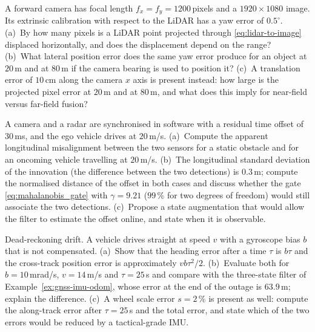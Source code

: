 \begin{prob}\label{prob:ch05:1}
A forward camera has focal length $f_{x}=f_{y}=1200$\,pixels and a $1920\times1080$ image. Its extrinsic calibration with respect to the LiDAR has a yaw error of $0.5^{\circ}$. (a)~By how many pixels is a LiDAR point projected through \eqref{eq:lidar-to-image} displaced horizontally, and does the displacement depend on the range? (b)~What lateral position error does the same yaw error produce for an object at $20$\,m and at $80$\,m if the camera bearing is used to position it? (c)~A translation error of $10$\,cm along the camera $x$ axis is present instead: how large is the projected pixel error at $20$\,m and at $80$\,m, and what does this imply for near-field versus far-field fusion?
\end{prob}

\begin{prob}\label{prob:ch05:2}
A camera and a radar are synchronised in software with a residual time offset of $30$\,ms, and the ego vehicle drives at $20$\,m/s. (a)~Compute the apparent longitudinal misalignment between the two sensors for a static obstacle and for an oncoming vehicle travelling at $20$\,m/s. (b)~The longitudinal standard deviation of the innovation (the difference between the two detections) is $0.3$\,m; compute the normalised distance of the offset in both cases and discuss whether the gate \eqref{eq:mahalanobis_gate} with $\gamma=9.21$ ($99$\,\% for two degrees of freedom) would still associate the two detections. (c)~Propose a state augmentation that would allow the filter to estimate the offset online, and state when it is observable.
\end{prob}

\begin{prob}\label{prob:ch05:3}
Dead-reckoning drift. A vehicle drives straight at speed $v$ with a gyroscope bias $b$ that is not compensated. (a)~Show that the heading error after a time $\tau$ is $b\tau$ and the cross-track position error is approximately $vb\tau^{2}/2$. (b)~Evaluate both for $b=10$\,mrad/s, $v=14$\,m/s and $\tau=25$\,s and compare with the three-state filter of Example~\ref{ex:gnss-imu-odom}, whose error at the end of the outage is $63.9$\,m; explain the difference. (c)~A wheel scale error $s=2$\,\% is present as well: compute the along-track error after $\tau=25$\,s and the total error, and state which of the two errors would be reduced by a tactical-grade IMU.
\end{prob}


